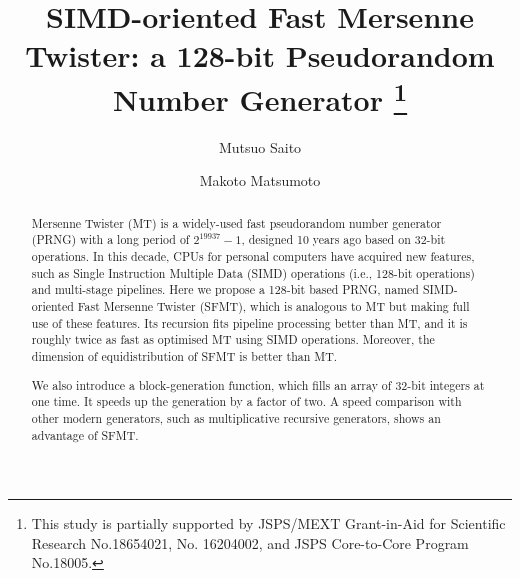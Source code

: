 \documentclass{svmult}
\begin{document}
\title*{SIMD-oriented Fast Mersenne Twister:
a 128-bit Pseudorandom Number Generator
\footnote{This study is partially supported by JSPS/MEXT
Grant-in-Aid for Scientific Research No.18654021, No. 16204002,
and JSPS Core-to-Core Program No.18005.
}
}
            

\author{Mutsuo Saito\and
Makoto Matsumoto}

\maketitle
            
\begin{abstract} 
Mersenne Twister (MT)
is a widely-used fast pseudorandom number generator (PRNG)
with a long period of $2^{19937}-1$,
designed 10 years ago based on 32-bit operations.
In this decade, CPUs for personal computers
have acquired new features, such as 
Single Instruction Multiple Data (SIMD) operations
(i.e., 128-bit operations) and multi-stage pipelines.
Here we propose a 128-bit based 
PRNG, named SIMD-oriented Fast Mersenne Twister
(SFMT), which is analogous to MT but making full use
of these features. Its recursion fits pipeline processing
better than MT, and it is roughly twice as fast as 
optimised MT using SIMD operations.
Moreover, the dimension of equidistribution of SFMT
is better than MT. 

We also introduce 
a block-generation function, 
which fills an array of 32-bit integers at one time.
It speeds up the generation by a factor of two. 
A speed comparison with other modern generators, 
such as multiplicative recursive generators,
shows an advantage of SFMT.
\end{abstract}
            


\end{document}
